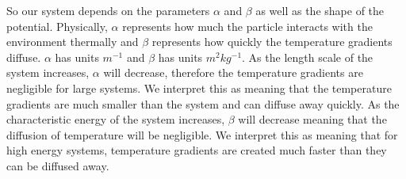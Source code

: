 So our system depends on the parameters $\alpha$ and $\beta$ as well as the shape of the potential. Physically, $\alpha$ represents how much the particle interacts with the environment thermally and $\beta$ represents how quickly the temperature gradients diffuse. $\alpha$ has units $m^{-1}$ and $\beta$ has units $m^2 kg^{-1}$. As the length scale of the system increases, $\alpha$ will decrease, therefore the temperature gradients are negligible for large systems. We interpret this as meaning that the temperature gradients are much smaller than the system and can diffuse away quickly. As the characteristic energy of the system increases, $\beta$ will decrease meaning that the diffusion of temperature will be negligible. We interpret this as meaning that for high energy systems, temperature gradients are created much faster than they can be diffused away. 



